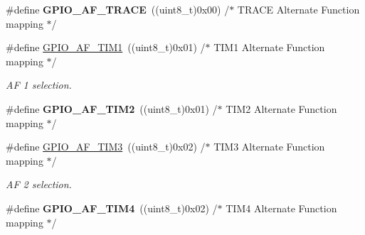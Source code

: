 \begin{DoxyCompactItemize}
\item 
\hypertarget{group___g_p_i_o___alternat__function__selection__define_gac97ace879d6584f8bd705fa1d199d4d4}{\#define {\bfseries G\-P\-I\-O\-\_\-\-A\-F\-\_\-\-T\-R\-A\-C\-E}~((uint8\-\_\-t)0x00)  /$\ast$ T\-R\-A\-C\-E Alternate Function mapping $\ast$/}\label{group___g_p_i_o___alternat__function__selection__define_gac97ace879d6584f8bd705fa1d199d4d4}

\item 
\hypertarget{group___g_p_i_o___alternat__function__selection__define_ga9a65573a3d8684febe1fda5c6cd8c992}{\#define \hyperlink{group___g_p_i_o___alternat__function__selection__define_ga9a65573a3d8684febe1fda5c6cd8c992}{G\-P\-I\-O\-\_\-\-A\-F\-\_\-\-T\-I\-M1}~((uint8\-\_\-t)0x01)  /$\ast$ T\-I\-M1 Alternate Function mapping $\ast$/}\label{group___g_p_i_o___alternat__function__selection__define_ga9a65573a3d8684febe1fda5c6cd8c992}

\begin{DoxyCompactList}\small\item\em A\-F 1 selection. \end{DoxyCompactList}\item 
\hypertarget{group___g_p_i_o___alternat__function__selection__define_ga6a1335e47fe67ff5a08ebe0ebfec2ffa}{\#define {\bfseries G\-P\-I\-O\-\_\-\-A\-F\-\_\-\-T\-I\-M2}~((uint8\-\_\-t)0x01)  /$\ast$ T\-I\-M2 Alternate Function mapping $\ast$/}\label{group___g_p_i_o___alternat__function__selection__define_ga6a1335e47fe67ff5a08ebe0ebfec2ffa}

\item 
\hypertarget{group___g_p_i_o___alternat__function__selection__define_ga8c6bda0c56abc29eef7709b52d9d3e0d}{\#define \hyperlink{group___g_p_i_o___alternat__function__selection__define_ga8c6bda0c56abc29eef7709b52d9d3e0d}{G\-P\-I\-O\-\_\-\-A\-F\-\_\-\-T\-I\-M3}~((uint8\-\_\-t)0x02)  /$\ast$ T\-I\-M3 Alternate Function mapping $\ast$/}\label{group___g_p_i_o___alternat__function__selection__define_ga8c6bda0c56abc29eef7709b52d9d3e0d}

\begin{DoxyCompactList}\small\item\em A\-F 2 selection. \end{DoxyCompactList}\item 
\hypertarget{group___g_p_i_o___alternat__function__selection__define_gabe02d26327e89fe4c9aaf30ec1187009}{\#define {\bfseries G\-P\-I\-O\-\_\-\-A\-F\-\_\-\-T\-I\-M4}~((uint8\-\_\-t)0x02)  /$\ast$ T\-I\-M4 Alternate Function mapping $\ast$/}\label{group___g_p_i_o___alternat__function__selection__define_gabe02d26327e89fe4c9aaf30ec1187009}


\end{DoxyCompactItemize}
